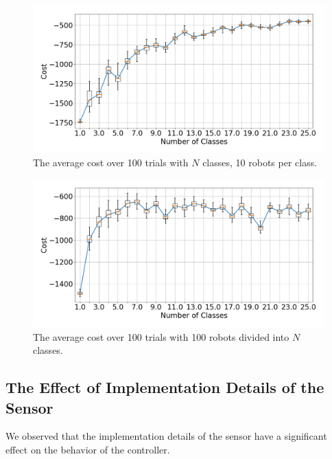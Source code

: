 \documentclass[letterpaper, 10 pt, conference]{ieeeconf}
\begin{document}
  \begin{figure}[t]
    \centering
    \includegraphics[width=1\linewidth]{./images/num_classes_vs_cost_10_per_class.png}
    \caption{The average cost over 100 trials with $N$ classes, 10 robots per class.}
    \label{fig:num_classes_10}
  \end{figure}

  \begin{figure}[t]
    \centering
    \includegraphics[width=1\linewidth]{./images/num_classes_vs_cost_100_robots.png}
    \caption{The average cost over 100 trials with 100 robots divided into $N$ classes.}
    \label{fig:num_classes_100}
  \end{figure}

  \subsection{The Effect of Implementation Details of the Sensor} \label{section:sensor_impl}

  We observed that the implementation details of the sensor have a significant
  effect on the behavior of the controller.
\end{document}
